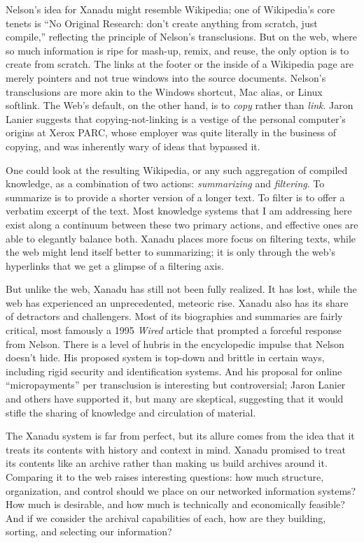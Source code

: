 Nelson's idea for Xanadu might resemble Wikipedia; one of Wikipedia's core tenets is ``No Original Research: don't create anything from scratch, just compile,'' reflecting the principle of Nelson's transclusions.\autocite[11-12]{reagle_good_2010} But on the web, where so much information is ripe for mash-up, remix, and reuse, the only option is to create from scratch. The links at the footer or the inside of a Wikipedia page are merely pointers and not true windows into the source documents. Nelson's transclusions are more akin to the Windows shortcut, Mac alias, or Linux softlink. The Web's default, on the other hand, is to \emph{copy} rather than \emph{link}. Jaron Lanier suggests that copying-not-linking is a vestige of the personal computer's origins at Xerox PARC, whose employer was quite literally in the business of copying, and was inherently wary of ideas that bypassed it.\autocite[221-232]{lanier_who_2013}

One could look at the resulting Wikipedia, or any such aggregation of compiled knowledge, as a combination of two actions: \emph{summarizing} and \emph{filtering}. To summarize is to provide a shorter version of a longer text. To filter is to offer a verbatim excerpt of the text. Most knowledge systems that I am addressing here exist along a continuum between these two primary actions, and effective ones are able to elegantly balance both. Xanadu places more focus on filtering texts, while the web might lend itself better to summarizing; it is only through the web's hyperlinks that we get a glimpse of a filtering axis.

But unlike the web, Xanadu has still not been fully realized. It has lost, while the web has experienced an unprecedented, meteoric rise. Xanadu also has its share of detractors and challengers. Most of its biographies and summaries are fairly critical, most famously a 1995 \emph{Wired} article that prompted a forceful response from Nelson.\autocite{wolf_curse_1995} There is a level of hubris in the encyclopedic impulse that Nelson doesn't hide. His proposed system is top-down and brittle in certain ways, including rigid security and identification systems. And his proposal for online ``micropayments'' per transclusion is interesting but controversial; Jaron Lanier and others have supported it, but many are skeptical, suggesting that it would stifle the sharing of knowledge and circulation of material.\autocites{atwood_xanadu_2009}[Chapter 18]{lanier_who_2013}

The Xanadu system is far from perfect, but its allure comes from the idea that it treats its contents with history and context in mind. Xanadu promised to treat its contents like an archive rather than making us build archives around it. Comparing it to the web raises interesting questions: how much structure, organization, and control should we place on our networked information systems? How much is desirable, and how much is technically and economically feasible? And if we consider the archival capabilities of each, how are they building, sorting, and selecting our information?

